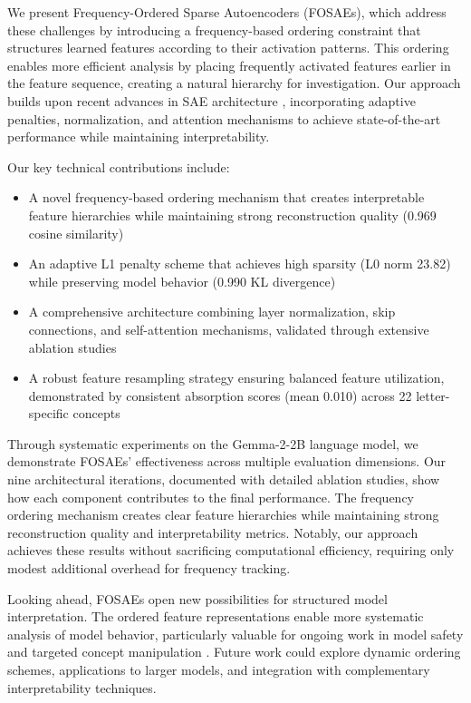 \documentclass{article} %
\begin{document}
We present Frequency-Ordered Sparse Autoencoders (FOSAEs), which address these challenges by introducing a frequency-based ordering constraint that structures learned features according to their activation patterns. This ordering enables more efficient analysis by placing frequently activated features earlier in the feature sequence, creating a natural hierarchy for investigation. Our approach builds upon recent advances in SAE architecture \cite{rajamanoharanImprovingDictionaryLearning2024}, incorporating adaptive penalties, normalization, and attention mechanisms to achieve state-of-the-art performance while maintaining interpretability.

Our key technical contributions include:
\begin{itemize}
    \item A novel frequency-based ordering mechanism that creates interpretable feature hierarchies while maintaining strong reconstruction quality (0.969 cosine similarity)
    \item An adaptive L1 penalty scheme that achieves high sparsity (L0 norm 23.82) while preserving model behavior (0.990 KL divergence)
    \item A comprehensive architecture combining layer normalization, skip connections, and self-attention mechanisms, validated through extensive ablation studies
    \item A robust feature resampling strategy ensuring balanced feature utilization, demonstrated by consistent absorption scores (mean 0.010) across 22 letter-specific concepts
\end{itemize}

Through systematic experiments on the Gemma-2-2B language model, we demonstrate FOSAEs' effectiveness across multiple evaluation dimensions. Our nine architectural iterations, documented with detailed ablation studies, show how each component contributes to the final performance. The frequency ordering mechanism creates clear feature hierarchies while maintaining strong reconstruction quality and interpretability metrics. Notably, our approach achieves these results without sacrificing computational efficiency, requiring only modest additional overhead for frequency tracking.

Looking ahead, FOSAEs open new possibilities for structured model interpretation. The ordered feature representations enable more systematic analysis of model behavior, particularly valuable for ongoing work in model safety \cite{liWMDPBenchmarkMeasuring2024} and targeted concept manipulation \cite{farrell2024applying}. Future work could explore dynamic ordering schemes, applications to larger models, and integration with complementary interpretability techniques.
\end{document}
